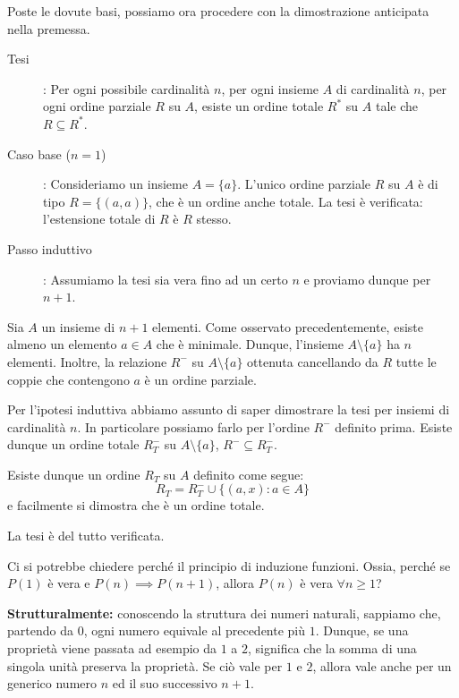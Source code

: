 \documentclass[12pt]{report}
\begin{document}
	Poste le dovute basi, possiamo ora procedere con la dimostrazione anticipata nella premessa.
	
	\begin{description}
		
		\item [Tesi]: Per ogni possibile cardinalità $n$, per ogni insieme $A$ di cardinalità $n$, per ogni ordine parziale $R$ su $A$, esiste un ordine totale $R^*$ su $A$ tale che $R \subseteq R^*$.
		
		\item [Caso base ($n=1$)]: Consideriamo un insieme $A = \{a\}$. L'unico ordine parziale $R$ su $A$ è di tipo $R = \{(a, a)\}$, che è un ordine anche totale. La tesi è verificata: l'estensione totale di $R$ è $R$ stesso.
		
		\item [Passo induttivo]: Assumiamo la tesi sia vera fino ad un certo $n$ e proviamo dunque per $n+1$.
		
	\end{description}
	
	Sia $A$ un insieme di $n+1$ elementi. Come osservato precedentemente, esiste almeno un elemento $a \in A$ che è minimale. Dunque, l'insieme $A \setminus \{a\}$ ha $n$ elementi. Inoltre, la relazione $R^-$ su $A \setminus \{a\}$ ottenuta cancellando da $R$ tutte le coppie che contengono $a$ è un ordine parziale.
	
	Per l'ipotesi induttiva abbiamo assunto di saper dimostrare la tesi per insiemi di cardinalità $n$. In particolare possiamo farlo per l'ordine $R^-$ definito prima. Esiste dunque un ordine totale $R_T^-$ su $A \setminus \{a\}$, $R^- \subseteq R_T^-$.
	
	Esiste dunque un ordine $R_T$ su $A$ definito come segue:
	\[
	R_T = R_T^- \cup \{(a, x) \colon a \in A\}
	\]
	e facilmente si dimostra che è un ordine totale.
	
	La tesi è del tutto verificata.
	
	Ci si potrebbe chiedere perché il principio di induzione funzioni. Ossia, perché se $P(1)$ è vera e $P(n) \implies P(n+1)$, allora $P(n)$ è vera $\forall n \ge 1$?
	
	\textbf{Strutturalmente:} conoscendo la struttura dei numeri naturali, sappiamo che, partendo da $0$, ogni numero equivale al precedente più $1$. Dunque, se una proprietà viene passata ad esempio da $1$ a $2$, significa che la somma di una singola unità preserva la proprietà. Se ciò vale per $1$ e $2$, allora vale anche per un generico numero $n$ ed il suo successivo $n+1$.
	
\end{document}
